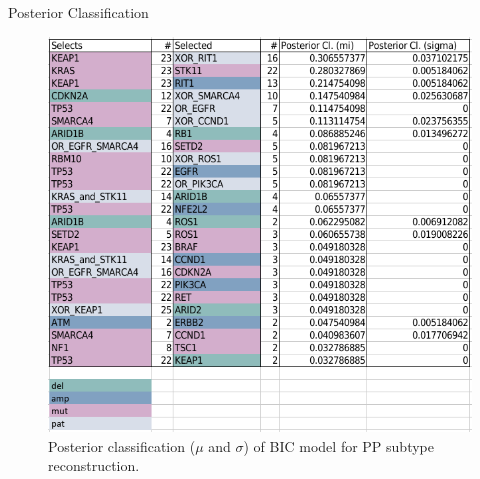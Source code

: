 \documentclass{beamer}
\begin{document}
\begin{frame}{Posterior Classification}
{\begin{figure}
      \includegraphics[scale = 0.4]{img/post_bic_PP.png}
      \caption{Posterior classification ($\mu$ and $\sigma$) of BIC model for PP
        subtype reconstruction.} 
    \end{figure}
  }
  
\end{frame}
\end{document}
